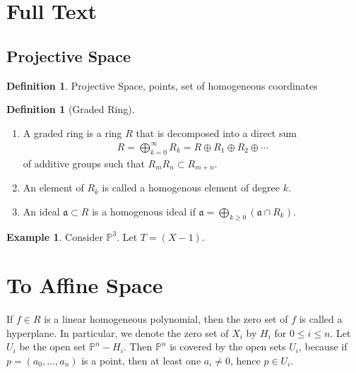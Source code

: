 \documentclass[11pt]{book}
\theoremstyle{definition}
\newtheorem{definition}[theorem]{Definition}
\newtheorem{example}[theorem]{Example}
\numberwithin{equation}{section}
\begin{document}
\section{Full Text}

\subsection{Projective Space}
\begin{defbox}
    \begin{definition}
        Projective Space, points, set of homogeneous coordinates
    \end{definition}
\end{defbox}
\begin{defbox}
    \begin{definition}[Graded Ring]
        \begin{enumerate}
            \item A graded ring is a ring \(R\) that is decomposed into a direct sum
            \begin{align*}
                R = \bigoplus_{k=0}^\infty R_k = R \oplus R_1 \oplus R_2 \oplus \cdots
            \end{align*}
            of additive groups such that \(R_m R_n \subset R_{m+n}\).
            \item An element of \(R_k\) is called a homogenous element of degree \(k\).
            \item An ideal \(\mathfrak{a} \subset R\) is a homogenous ideal if \(\mathfrak{a} = \bigoplus_{k \geq 0}(\mathfrak{a} \cap R_k)\).
        \end{enumerate}

    \end{definition}
\end{defbox}

\begin{example}
    Consider \(\mathbb{P}^3\). Let \(T = (X - 1)\).
\end{example}

\newpage
\section{To Affine Space}
If \(f \in R\) is a linear homogeneous polynomial, then the zero set of \(f\) is called a hyperplane. In particular, we denote the zero set of \(X_i\) by \(H_i\) for \(0 \leq i \leq n\). Let \(U_i\) be the open set \(\mathbb{P}^n - H_i\). Then \(\mathbb{P}^n\) is covered by the open sets \(U_i\), because if \(p = (a_0, \ldots, a_n)\) is a point, then at least one \(a_i \neq 0\), hence \(p \in U_i\).
\newpage
\end{document}
